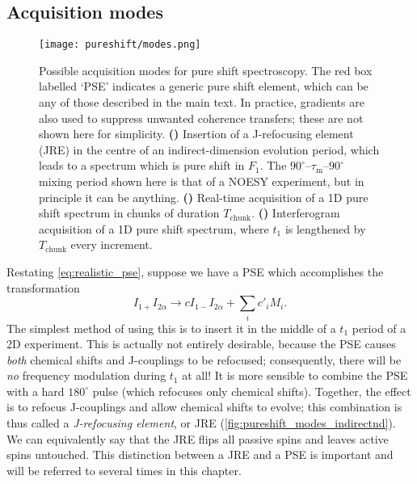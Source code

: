 \subsection{Acquisition modes}
\label{subsec:pureshift__acquisition_modes}

\begin{figure}[htbp]
    \centering
    \texttt{[image: pureshift/modes.png]}
    {\label{fig:pureshift_modes_indirectnd}}
    {\label{fig:pureshift_modes_realtime}}
    {\label{fig:pureshift_modes_interferogram}}
    \caption[Pure shift acquisition modes]{
        Possible acquisition modes for pure shift spectroscopy.
        The red box labelled `PSE' indicates a generic pure shift element, which can be any of those described in the main text.
        In practice, gradients are also used to suppress unwanted coherence transfers; these are not shown here for simplicity.
        \textbf{()} Insertion of a J-refocusing element (JRE) in the centre of an indirect-dimension evolution period, which leads to a spectrum which is pure shift in $F_1$.
        The $90^\circ$--$\tau_\mathrm{m}$--$90^\circ$ mixing period shown here is that of a NOESY experiment, but in principle it can be anything.
        \textbf{()} Real-time acquisition of a 1D pure shift spectrum in chunks of duration $T_\text{chunk}$.
        \textbf{()} Interferogram acquisition of a 1D pure shift spectrum, where $t_1$ is lengthened by $T_\text{chunk}$ every increment.
    }
    \label{fig:pureshift_modes}
\end{figure}

Restating \cref{eq:realistic_pse}, suppose we have a PSE which accomplishes the transformation
\begin{equation}
    \label{eq:pse_revisited}
    I_{1+}I_{2\alpha} \longrightarrow c I_{1-}I_{2\alpha} + \sum_i c'_i M_i.
\end{equation}
The simplest method of using this is to insert it in the middle of a $t_1$ period of a 2D experiment.
This is actually not entirely desirable, because the PSE causes \textit{both} chemical shifts and J-couplings to be refocused; consequently, there will be \textit{no} frequency modulation during $t_1$ at all!
It is more sensible to combine the PSE with a hard $180^\circ$ pulse (which refocuses only chemical shifts).
Together, the effect is to refocus J-couplings and allow chemical shifts to evolve; this combination is thus called a \textit{J-refocusing element}, or JRE (\cref{fig:pureshift_modes_indirectnd}).
We can equivalently say that the JRE flips all passive spins and leaves active spins untouched.
This distinction between a JRE and a PSE is important and will be referred to several times in this chapter.

